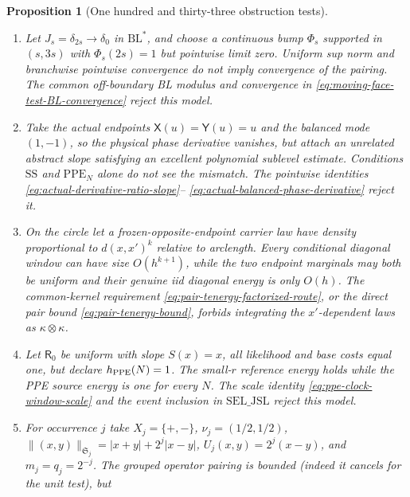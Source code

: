 \documentclass[11pt]{article}
\newtheorem{proposition}[theorem]{Proposition}
\begin{document}
\begin{proposition}[One hundred and thirty-three obstruction tests]
\begin{enumerate}[label=\textup{(T\arabic*)}]
      $-m_J^-\otimes\mu_0$ and $-\mu_0\otimes m_J^+$, which are neither a
      four-dimensional density nor a one-dimensional graph face.  The fourth
      type \eqref{eq:product-current-type}, its exact joint cluster
      \eqref{eq:typed-face-product-cluster}, and its convergence
      \eqref{eq:product-current-DQ-convergence} reject either
      misclassification.
\item Let $J_s=\delta_{2s}\to\delta_0$ in $\mathrm{BL}^*$, and choose a
      continuous bump $\Phi_s$ supported in $(s,3s)$ with
      $\Phi_s(2s)=1$ but pointwise limit zero.  Uniform sup norm and
      branchwise pointwise convergence do not imply convergence of the
      pairing.  The common off-boundary BL modulus and convergence in
      \eqref{eq:moving-face-test-BL-convergence} reject this model.
\item Take the actual endpoints $\mathsf X(u)=\mathsf Y(u)=u$ and the
      balanced mode $(1,-1)$, so the physical phase derivative vanishes,
      but attach an unrelated abstract slope satisfying an excellent
      polynomial sublevel estimate.  Conditions $\mathrm{SS}$ and
      $\mathrm{PPE}_{N}$ alone do not see the mismatch.  The pointwise
      identities \eqref{eq:actual-derivative-ratio-slope}--
      \eqref{eq:actual-balanced-phase-derivative} reject it.
\item On the circle let a frozen-opposite-endpoint carrier law have density
      proportional to $d(x,x')^k$ relative to arclength.  Every conditional
      diagonal window can have size $O(h^{k+1})$, while the two endpoint
      marginals may both be uniform and their genuine iid diagonal energy is
      only $O(h)$.  The common-kernel requirement
      \eqref{eq:pair-tenergy-factorized-route}, or the direct pair bound
      \eqref{eq:pair-tenergy-bound}, forbids integrating the
      $x'$-dependent laws as $\kappa\otimes\kappa$.
\item Let $\mathsf R_0$ be uniform with slope $S(x)=x$, all likelihood and
      base costs equal one, but declare $h_{\rm PPE}(N)=1$.  The small-$r$
      reference energy holds while the PPE source energy is one for every
      $N$.  The scale identity \eqref{eq:ppe-clock-window-scale} and the
      event inclusion in $\mathrm{SEL\_JSL}$ reject this model.
\item For occurrence $j$ take $X_j=\{+,-\}$,
      $\nu_j=(1/2,1/2)$,
      $\|(x,y)\|_{\mathfrak S_j}=|x+y|+2^j|x-y|$,
      $U_j(x,y)=2^j(x-y)$, and $m_j=q_j=2^{-j}$.  The grouped operator
      pairing is bounded (indeed it cancels for the unit test), but

\end{enumerate}
\end{proposition}
\end{document}
